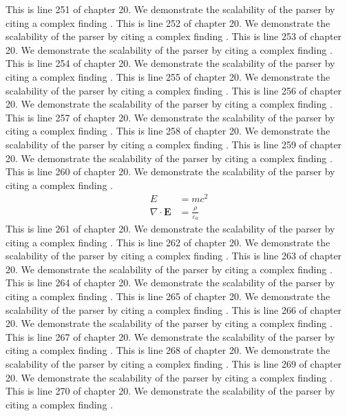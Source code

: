 This is line 251 of chapter 20. We demonstrate the scalability of the parser by citing a complex finding \cite{ref20_251}.
This is line 252 of chapter 20. We demonstrate the scalability of the parser by citing a complex finding \cite{ref20_252}.
This is line 253 of chapter 20. We demonstrate the scalability of the parser by citing a complex finding \cite{ref20_253}.
This is line 254 of chapter 20. We demonstrate the scalability of the parser by citing a complex finding \cite{ref20_254}.
This is line 255 of chapter 20. We demonstrate the scalability of the parser by citing a complex finding \cite{ref20_255}.
This is line 256 of chapter 20. We demonstrate the scalability of the parser by citing a complex finding \cite{ref20_256}.
This is line 257 of chapter 20. We demonstrate the scalability of the parser by citing a complex finding \cite{ref20_257}.
This is line 258 of chapter 20. We demonstrate the scalability of the parser by citing a complex finding \cite{ref20_258}.
This is line 259 of chapter 20. We demonstrate the scalability of the parser by citing a complex finding \cite{ref20_259}.
This is line 260 of chapter 20. We demonstrate the scalability of the parser by citing a complex finding \cite{ref20_260}.
\begin{align*}
  E &= mc^2 \\
  \nabla \cdot \mathbf{E} &= \frac{\rho}{\varepsilon_0}
\end{align*}
This is line 261 of chapter 20. We demonstrate the scalability of the parser by citing a complex finding \cite{ref20_261}.
This is line 262 of chapter 20. We demonstrate the scalability of the parser by citing a complex finding \cite{ref20_262}.
This is line 263 of chapter 20. We demonstrate the scalability of the parser by citing a complex finding \cite{ref20_263}.
This is line 264 of chapter 20. We demonstrate the scalability of the parser by citing a complex finding \cite{ref20_264}.
This is line 265 of chapter 20. We demonstrate the scalability of the parser by citing a complex finding \cite{ref20_265}.
This is line 266 of chapter 20. We demonstrate the scalability of the parser by citing a complex finding \cite{ref20_266}.
This is line 267 of chapter 20. We demonstrate the scalability of the parser by citing a complex finding \cite{ref20_267}.
This is line 268 of chapter 20. We demonstrate the scalability of the parser by citing a complex finding \cite{ref20_268}.
This is line 269 of chapter 20. We demonstrate the scalability of the parser by citing a complex finding \cite{ref20_269}.
This is line 270 of chapter 20. We demonstrate the scalability of the parser by citing a complex finding \cite{ref20_270}.
